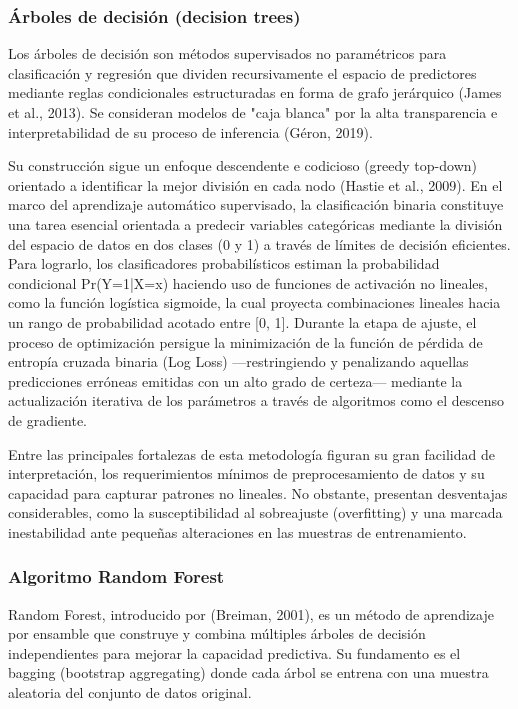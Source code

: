 \documentclass[11pt,oneside,openany]{book}
\begin{document}
\subsubsection*{Árboles de decisión (decision trees)}

Los árboles de decisión son métodos supervisados no paramétricos para clasificación y regresión que dividen recursivamente el espacio de predictores mediante reglas condicionales estructuradas en forma de grafo jerárquico (James et al., 2013). Se consideran modelos de "caja blanca" por la alta transparencia e interpretabilidad de su proceso de inferencia (Géron, 2019).

Su construcción sigue un enfoque descendente e codicioso (greedy top-down) orientado a identificar la mejor división en cada nodo (Hastie et al., 2009). En el marco del aprendizaje automático supervisado, la clasificación binaria constituye una tarea esencial orientada a predecir variables categóricas mediante la división del espacio de datos en dos clases (0 y 1) a través de límites de decisión eficientes. Para lograrlo, los clasificadores probabilísticos estiman la probabilidad condicional Pr(Y=1|X=x) haciendo uso de funciones de activación no lineales, como la función logística sigmoide, la cual proyecta combinaciones lineales hacia un rango de probabilidad acotado entre [0, 1]. Durante la etapa de ajuste, el proceso de optimización persigue la minimización de la función de pérdida de entropía cruzada binaria (Log Loss) ---restringiendo y penalizando aquellas predicciones erróneas emitidas con un alto grado de certeza--- mediante la actualización iterativa de los parámetros a través de algoritmos como el descenso de gradiente.

Entre las principales fortalezas de esta metodología figuran su gran facilidad de interpretación, los requerimientos mínimos de preprocesamiento de datos y su capacidad para capturar patrones no lineales. No obstante, presentan desventajas considerables, como la susceptibilidad al sobreajuste (overfitting) y una marcada inestabilidad ante pequeñas alteraciones en las muestras de entrenamiento.

\subsubsection*{Algoritmo Random Forest}

Random Forest, introducido por (Breiman, 2001), es un método de aprendizaje por ensamble que construye y combina múltiples árboles de decisión independientes para mejorar la capacidad predictiva. Su fundamento es el bagging (bootstrap aggregating) donde cada árbol se entrena con una muestra aleatoria del conjunto de datos original.
\end{document}
